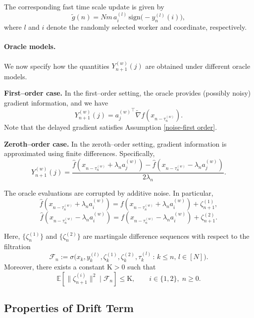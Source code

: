 \documentclass{article}
\begin{document}
The corresponding fast time scale update is given by
\begin{equation}
\widetilde{g}(n)
= Nm\, a_i^{(l)}\,\mathrm{sign}\!\bigl(-y_n^{(l)}(i)\bigr),
\label{asynslowr}
\end{equation}
where $l$ and $i$ denote the randomly selected worker and coordinate, respectively.



\paragraph{Oracle models.}
We now specify how the quantities $Y_{n+1}^{(w)}(j)$ are obtained under different oracle models.

\textbf{First--order case.}
In the first--order setting, the oracle provides (possibly noisy) gradient information, and we have
\begin{equation}
Y_{n+1}^{(w)}(j)
= {a_j^{(w)}}^\top \widetilde{\nabla} f(x_{n- \tau_n^{(w)}}).
\label{AFOoravr}
\end{equation}
Note that the delayed gradient satisfies Assumption \ref{noise-first order}.

\textbf{Zeroth--order case.}
In the zeroth--order setting, gradient information is approximated using finite differences. Specifically,
\begin{equation}
Y_{n+1}^{(w)}(j)
=
\frac{\widehat{f}(x_{n-\tau_n^{(w)}} + \lambda_n a_j^{(w)})
      - \widehat{f}(x_{n-\tau_n^{(w)}} - \lambda_n a_j^{(w)})}
     {2\lambda_n}.
\label{AZOSJDr}
\end{equation}

The oracle evaluations are corrupted by additive noise. In particular,
\[
\widehat{f}(x_{n-\tau_n^{(w)}} + \lambda_n a_i^{(w)})
= f(x_{n-\tau_n^{(w)}} + \lambda_n a_i^{(w)}) + \zeta_{n+1}^{(1)},
\]
\[
\widehat{f}(x_{n-\tau_n^{(w)}} - \lambda_n a_i^{(w)})
= f(x_{n-\tau_n^{(w)}} - \lambda_n a_i^{(w)}) + \zeta_{n+1}^{(2)}.
\]

Here, $\{\zeta_n^{(1)}\}$ and $\{\zeta_n^{(2)}\}$ are martingale difference sequences with respect to the filtration
\[
\mathcal{F}_n := \sigma\!\bigl(x_k, y_k^{(l)}, \zeta_k^{(1)}, \zeta_k^{(2)}, \tau_k^{(l)} \,:\, k \le n,\, l \in [N] \bigr).
\]
Moreover, there exists a constant $\mathrm{K} > 0$ such that
\[
\mathbb{E}\!\left[\|\zeta_{n+1}^{(i)}\|^2 \mid \mathcal{F}_n\right]
\le \mathrm{K},
\qquad i \in \{1,2\},\; n \ge 0.
\]

\subsection{Properties of Drift Term}
\end{document}
